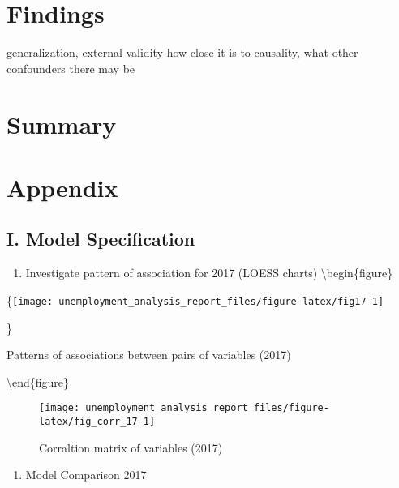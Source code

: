 \documentclass[
]{article}
\providecommand{\tightlist}{%
  \setlength{\itemsep}{0pt}\setlength{\parskip}{0pt}}
\begin{document}
\hypertarget{findings}{%
\section{Findings}\label{findings}}

generalization, external validity how close it is to causality, what
other confounders there may be

\hypertarget{summary}{%
\section{Summary}\label{summary}}

\hypertarget{appendix}{%
\section{Appendix}\label{appendix}}

\hypertarget{i.-model-specification}{%
\subsection{I. Model Specification}\label{i.-model-specification}}

\begin{enumerate}
\def\labelenumi{\arabic{enumi}.}
\tightlist
\item
  Investigate pattern of association for 2017 (LOESS charts)
  \textbackslash begin\{figure\}
\end{enumerate}

\{\centering \texttt{[image: unemployment\_analysis\_report\_files/figure-latex/fig17-1]}

\}

\caption{Patterns of associations between pairs of variables (2017)}\label{fig:fig17}

\textbackslash end\{figure\}

\begin{figure}

{\centering \texttt{[image: unemployment\_analysis\_report\_files/figure-latex/fig\_corr\_17-1]} 

}

\caption{Corraltion matrix of variables (2017)}\label{fig:fig_corr_17}
\end{figure}

\begin{enumerate}
\def\labelenumi{\arabic{enumi}.}
\setcounter{enumi}{1}
\tightlist
\item
  Model Comparison 2017
\end{enumerate}
\end{document}
